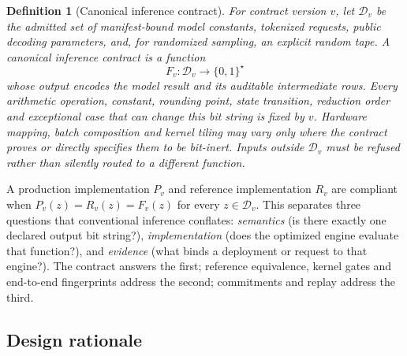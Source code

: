 \documentclass{article}
\newtheorem{Def}{Definition}[section]
\begin{document}
\begin{samepage}
\begin{Def}[Canonical inference contract]
\label{def:canonical-contract}
For contract version $v$, let $\mathcal{D}_v$ be the admitted set of manifest-bound model
constants, tokenized requests, public decoding parameters, and, for randomized sampling, an
explicit random tape.  A \emph{canonical inference contract} is a function
\begin{equation}
  F_v:\mathcal{D}_v\longrightarrow\{0,1\}^{\star}
  \label{eq:canonical-function}
\end{equation}
whose output encodes the model result and its auditable intermediate rows.  Every arithmetic
operation, constant, rounding point, state transition, reduction order and exceptional case
that can change this bit string is fixed by $v$.  Hardware mapping, batch composition and
kernel tiling may vary only where the contract proves or directly specifies them to be
bit-inert.  Inputs outside $\mathcal{D}_v$ must be refused rather than silently routed to a
different function.
\end{Def}
\end{samepage}

A production implementation $P_v$ and reference implementation $R_v$ are compliant when
$P_v(z)=R_v(z)=F_v(z)$ for every $z\in\mathcal{D}_v$.  This separates three questions that
conventional inference conflates: \emph{semantics} (is there exactly one declared output bit
string?), \emph{implementation} (does the optimized engine evaluate that function?), and
\emph{evidence} (what binds a deployment or request to that engine?).  The contract answers
the first; reference equivalence, kernel gates and end-to-end fingerprints address the
second; commitments and replay address the third.

\begin{center}
\end{center}

\subsection{Design rationale}
\end{document}
